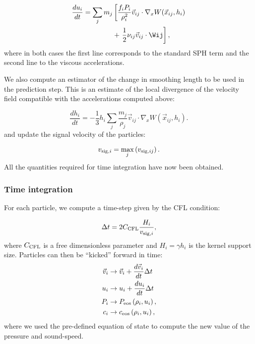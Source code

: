 \begin{align}
  \frac{du_i}{dt} = \sum_j m_j &\left[\frac{f_iP_i}{\rho_i^2}  \vec{v}_{ij}
    \cdot \nabla_x W(\vec{x}_{ij}, h_i) \right. \label{eq:sph:minimal:du_dt}\\
    &+\left. \frac{1}{2}\nu_{ij}\vec{v}_{ij}\cdot\Big. \Wij\right], \nonumber
\end{align}
where in both cases the first line corresponds to the standard SPH
term and the second line to the viscous accelerations.

We also compute an estimator of the change in smoothing length to be
used in the prediction step. This is an estimate of the local
divergence of the velocity field compatible with the accelerations
computed above:

\begin{equation}
  \frac{dh_i}{dt} = -\frac{1}{3}h_i \sum_j \frac{m_j}{\rho_j}
  \vec{v}_{ij}\cdot \nabla_x W(\vec{x}_{ij}, h_i).
  \label{eq:sph:minimal:dh_dt}
\end{equation}
and update the signal velocity of the particles:

\begin{equation}
  v_{{\rm sig},i} = \max_j \left( v_{{\rm sig},ij} \right).
  \label{eq:sph:minimal:v_sig_update}
\end{equation}
All the quantities required for time integration have now been obtained.

\subsubsection{Time integration}

For each particle, we compute a time-step given by the CFL condition:

\begin{equation}
  \Delta t = 2 C_{\rm CFL} \frac{H_i}{v_{{\rm sig},i}},
    \label{eq:sph:minimal:dt}
\end{equation}
where $C_{\rm CFL}$ is a free dimensionless parameter and $H_i = \gamma h_i$ is
the kernel support size. Particles can then be ``kicked'' forward in time:
\begin{align}
  \vec{v}_i &\rightarrow \vec{v}_i + \frac{d\vec{v}_i}{dt} \Delta t 
\label{eq:sph:minimal:kick_v}\\
  u_i &\rightarrow u_i + \frac{du_i}{dt} \Delta t
\label{eq:sph:minimal:kick_u}\\
  P_i &\rightarrow P_{\rm eos}\left(\rho_i, u_i\right)
\label{eq:sph:minimal:kick_P}, \\
  c_i &\rightarrow c_{\rm eos}\left(\rho_i, u_i\right)
\label{eq:sph:minimal:kick_c},
\end{align}
where we used the pre-defined equation of state to compute the new
value of the pressure and sound-speed.


